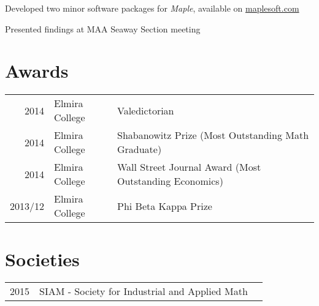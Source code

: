 \documentclass[letterpaper]{pine-resume} %
\begin{document}
\begin{minipage}[t]{0.66\textwidth}
\sectionspace %



\begin{tightitemize}
\item Developed two minor software packages for \emph{Maple}, available on \href{http://www.maplesoft.com/}{maplesoft.com}
\item Presented findings at MAA Seaway Section meeting
\end{tightitemize}

\sectionspace %


\section{Awards}

\begin{tabular}{rll}
2014	 & Elmira College & Valedictorian \\
2014	 & Elmira College & Shabanowitz Prize (Most Outstanding Math Graduate) \\
2014	 & Elmira College & Wall Street Journal Award (Most Outstanding Economics) \\
2013/12  & Elmira College & Phi Beta Kappa Prize \\
\end{tabular}

\sectionspace %


\section{Societies}

\begin{tabular}{rll}
2015 & SIAM - Society for Industrial and Applied Math \\
\end{tabular}

\sectionspace %



\end{minipage}
\end{document}
